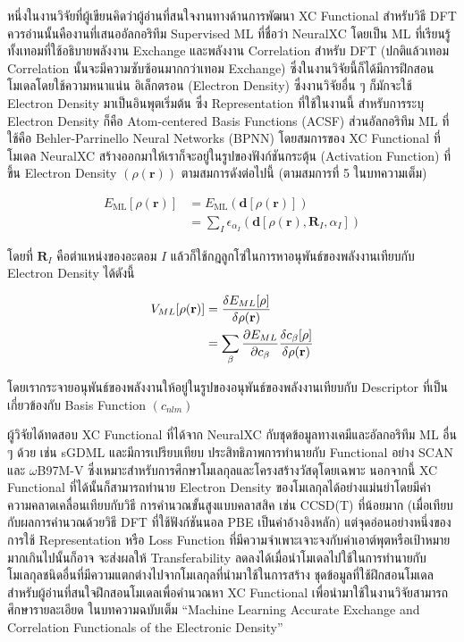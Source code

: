 หนึ่งในงานวิจัยที่ผู้เขียนคิดว่าผู้อ่านที่สนใจงานทางด้านการพัฒนา XC Functional สำหรับวิธี DFT ควรอ่านนั้นคืองานที่เสนออัลกอริทึม Supervised 
ML ที่ชื่อว่า NeuralXC\autocite{dick2020} โดยเป็น ML ที่เรียนรู้ทั้งเทอมที่ใช้อธิบายพลังงาน Exchange และพลังงาน Correlation สำหรับ 
DFT (ปกติแล้วเทอม Correlation นั้นจะมีความซับซ้อนมากกว่าเทอม Exchange) ซึ่งในงานวิจัยนี้ก็ได้มีการฝึกสอนโมเดลโดยใช้ความหนาแน่น%
อิเล็กตรอน (Electron Density) ซึ่งงานวิจัยอื่น ๆ ก็มักจะใช้ Electron Density มาเป็นอินพุตเริ่มต้น ซึ่ง Representation ที่ใช้ในงานนี้%
สำหรับการระบุ Electron Density ก็คือ Atom-centered Basis Functions (ACSF) ส่วนอัลกอริทึม ML ที่ใช้คือ Behler-Parrinello 
Neural Networks (BPNN) โดยสมการของ XC Functional ที่โมเดล NeuralXC สร้างออกมาให้เราก็จะอยู่ในรูปของฟังก์ชันกระตุ้น 
(Activation Function) ที่ขึ้น Electron Density $(\rho ({\bm{r}}))$ ตามสมการดังต่อไปนี้ (ตามสมการที่ 5 ในบทความเต็ม) 

\begin{align}
    E_{\text{ML}} [\rho ({\bm{r}})] &= E_{\text{ML}}({\bm{d}}[\rho ({\bm{r}})]) \nonumber \\
    &= \sum_{I}{\epsilon}_{\alpha_{I}}(\bm{d}[\rho (\bm{r}), {\bm{R}}_{I}, \alpha_{I}])
\end{align}

\noindent โดยที่ $\bm{R}_{I}$ คือตำแหน่งของอะตอม $I$ แล้วก็ใช้กฎลูกโซ่ในการหาอนุพันธ์ของพลังงานเทียบกับ Electron Density 
ได้ดังนี้

\begin{align}
    {V}_{{{M}}L}[\rho ({\bf{r}})] &= \frac{\delta {E}_{{{M}}L}[\rho ]}{\delta \rho ({\bf{r}})} \nonumber \\
    &= \sum_{\beta} \frac{\partial {E}_{{{M}}L}}{\partial {c}_{\beta }} 
    \frac{\delta {c}_{\beta }[\rho ]}{\delta \rho ({\bf{r}})}
\end{align}

\noindent โดยเรากระจายอนุพันธ์ของพลังงานให้อยู่ในรูปของอนุพันธ์ของพลังงานเทียบกับ Descriptor ที่เป็นเกี่ยวข้องกับ Basis Function 
$(c_{nlm})$ 

ผู้วิจัยได้ทดสอบ XC Functional ที่ได้จาก NeuralXC กับชุดข้อมูลทางเคมีและอัลกอริทึม ML อื่น ๆ ด้วย เช่น sGDML และมีการเปรียบเทียบ%
ประสิทธิภาพการทำนายกับ Functional อย่าง SCAN และ $\omega$B97M-V ซึ่งเหมาะสำหรับการศึกษาโมเลกุลและโครงสร้างวัสดุโดยเฉพาะ 
นอกจากนี้ XC Functional ที่ได้นั้นก็สามารถทำนาย Electron Density ของโมเลกุลได้อย่างแม่นยำโดยมีค่าความคลาดเคลื่อนเทียบกับวิธี%
การคำนวณขั้นสูงแบบคลาสสิค เช่น CCSD(T) ที่น้อยมาก (เมื่อเทียบกับผลการคำนวณด้วยวิธี DFT ที่ใช้ฟังก์ชันนอล PBE เป็นค่าอ้างอิงหลัก) 
แต่จุดอ่อนอย่างหนึ่งของการใช้ Representation หรือ Loss Function ที่มีความจำเพาะเจาะจงกับค่าเอาต์พุตหรือเป้าหมายมากเกินไปนั้นก็อาจ%
จะส่งผลให้ Transferability ลดลงได้เมื่อนำโมเดลไปใช้ในการทำนายกับโมเลกุลชนิดอื่นที่มีความแตกต่างไปจากโมเลกุลที่นำมาใช้ในการสร้าง%
ชุดข้อมูลที่ใช้ฝึกสอนโมเดล สำหรับผู้อ่านที่สนใจฝึกสอนโมเดลเพื่อคำนวณหา XC Functional เพื่อนำมาใช้ในงานวิจัยสามารถศึกษารายละเอียด%
ในบทความฉบับเต็ม \enquote{Machine Learning Accurate Exchange and Correlation Functionals of the Electronic Density}

